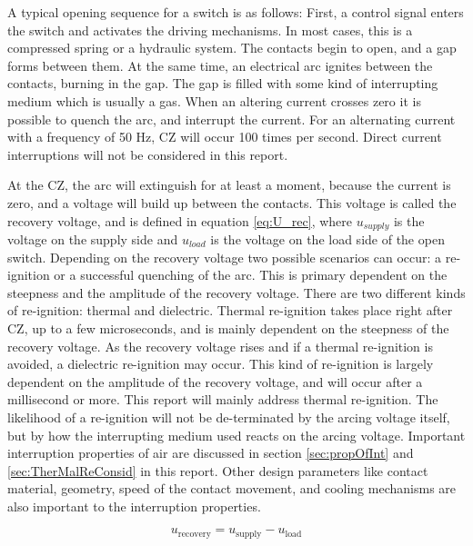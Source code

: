 \documentclass[10pt,b5paper,twoside]{article}
\begin{document}
A typical opening sequence for a switch is as follows: First, a control signal enters the switch and activates the driving mechanisms. In most cases, this is a compressed spring or a hydraulic system. The contacts begin to open, and a gap forms between them. At the same time, an electrical arc ignites between the contacts, burning in the gap. The gap is filled with some kind of interrupting medium which is usually a gas. When an altering current crosses zero it is possible to quench the arc, and interrupt the current. For an alternating current with a frequency of 50 Hz, CZ will occur 100 times per second. Direct current interruptions will not be considered in this report.


At the CZ, the arc will extinguish for at least a moment, because the current is zero, and a voltage will build up between the contacts. This voltage is called the recovery voltage, and is defined in equation \eqref{eq:U_rec}, where $u_{supply}$ is the voltage on the supply side and $u_{load}$ is the voltage on the load side of the open switch. Depending on the recovery voltage two possible scenarios can occur: a re-ignition or a successful quenching of the arc. This is primary dependent on the steepness and the amplitude of the recovery voltage. There are two different kinds of re-ignition: thermal and dielectric. Thermal re-ignition takes place right after CZ, up to a few microseconds, and is mainly dependent on the steepness of the recovery voltage. As the recovery voltage rises and if a thermal re-ignition is avoided, a dielectric re-ignition may occur. This kind of re-ignition is largely dependent on the amplitude of the recovery voltage, and will occur after a millisecond or more. This report will mainly address thermal re-ignition. The likelihood of a re-ignition  will not be de-terminated by the arcing voltage itself, but by how the interrupting medium used reacts on the arcing voltage. Important interruption properties of air are discussed in section \ref{sec:propOfInt} and \ref{sec:TherMalReConsid} in this report. Other design parameters like contact material, geometry, speed of the contact movement, and cooling mechanisms are also important to the interruption properties.

\begin{equation} \label{eq:U_rec}
u_\mathrm{{recovery}}=u_\mathrm{{supply}}-u_\mathrm{{load}}
\end{equation}  
\end{document}
